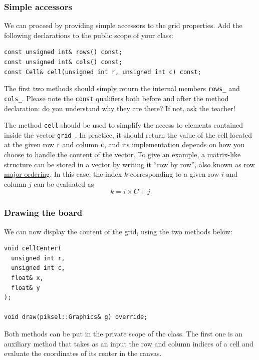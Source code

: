 \documentclass{article}
\begin{document}
\subsubsection{Simple accessors}\label{sec:simple_accessors}

We can proceed by providing simple accessors to the grid properties. Add the following declarations to the public scope of your class:
\begin{center}
\begin{minipage}{.9\textwidth}
\begin{lstlisting}[style=mycpp,numbers=none]
const unsigned int& rows() const;
const unsigned int& cols() const;
const Cell& cell(unsigned int r, unsigned int c) const;
\end{lstlisting}
\end{minipage}
\end{center}
The first two methods should simply return the internal members \texttt{rows\string_} and \texttt{cols\string_}. Please note the \texttt{const} qualifiers both before and after the method declaration: do you understand why they are there? If not, ask the teacher!

The method \texttt{cell} should be used to simplify the access to elements contained inside the vector \texttt{grid\string_}. In practice, it should return the value of the cell located at the given row \texttt{r} and column \texttt{c}, and its implementation depends on how you choose to handle the content of the vector. To give an example, a matrix-like structure can be stored in a vector by writing it ``row by row'', also known as \href{https://en.wikipedia.org/wiki/Row-_and_column-major_order#Programming_languages_and_libraries}{row major ordering}. In this case, the index $k$ corresponding to a given row $i$ and column $j$ can be evaluated as $$k = i \times C + j$$


\subsubsection{Drawing the board}

We can now display the content of the grid, using the two methods below:
\begin{center}
\begin{minipage}{.9\textwidth}
\begin{lstlisting}[style=mycpp,numbers=none]
void cellCenter(
  unsigned int r,
  unsigned int c,
  float& x,
  float& y
);

void draw(piksel::Graphics& g) override;
\end{lstlisting}
\end{minipage}
\end{center}
Both methods can be put in the private scope of the class. The first one is an auxiliary method that takes as an input the row and column indices of a cell and evaluate the coordinates of its center in the canvas.
\end{document}
